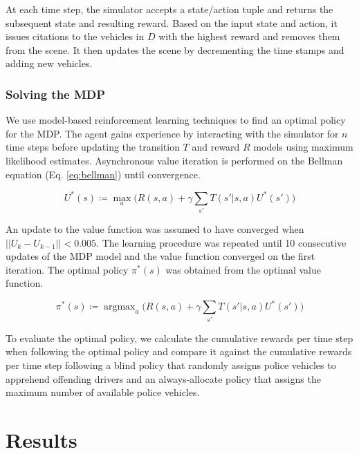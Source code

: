\documentclass[10pt,journal]{IEEEtran}
\DeclareMathOperator*{\argmax}{argmax}
\begin{document}
At each time step, the simulator accepts a state/action tuple and returns the subsequent state and resulting reward. Based on the input state and action, it issues citations to the vehicles in $D$ with the highest reward and removes them from the scene. It then updates the scene by decrementing the time stamps and adding new vehicles.  

\subsubsection*{Solving the MDP}
We use model-based reinforcement learning techniques to find an optimal policy for the MDP. The agent gains experience by interacting with the simulator for $n$ time steps before updating the transition $T$ and reward $R$ models using maximum likelihood estimates. Asynchronous value iteration is performed on the Bellman equation (Eq. \ref{eq:bellman}) until convergence.

\begin{equation} \label{eq:bellman}
	U^*(s) \coloneqq \max_{a}{\bigl(R(s,a)+\gamma\sum_{s'}T(s'|s,a)U^*(s')\bigr)}
\end{equation}

An update to the value function was assumed to have converged when $||U_k-U_{k-1}|| < 0.005$. The learning procedure was repeated until 10 consecutive updates of the MDP model and the value function converged on the first iteration. The optimal policy $\pi^{*}(s)$ was obtained from the optimal value function.

\begin{equation*} \label{eq:bellmanpolicy}
	\pi^*(s) \coloneqq \argmax_{a}{\bigl(R(s,a)+\gamma\sum_{s'}T(s'|s,a)U^*(s')\bigr)}
\end{equation*}

To evaluate the optimal policy, we calculate the cumulative rewards per time step when following the optimal policy and compare it against the cumulative rewards per time step following a blind policy that randomly assigns police vehicles to apprehend offending drivers and an always-allocate policy that assigns the maximum number of available police vehicles.


\section{Results}
\end{document}
